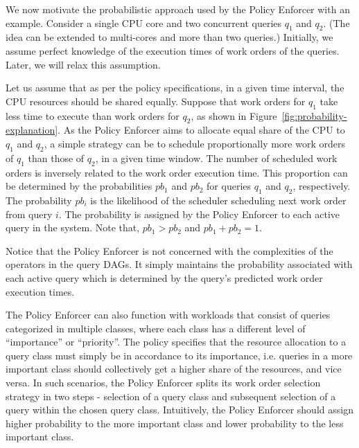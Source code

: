 We now motivate the probabilistic approach used by the Policy Enforcer with an example.
Consider a single CPU core and two concurrent queries $q_{1}$ and $q_{2}$. 
(The idea can be extended to multi-cores and more than two queries.)
Initially, we assume perfect knowledge of the execution times of work orders of the queries. 
Later, we will relax this assumption. 

Let us assume that as per the policy specifications, in a given time interval, the CPU resources should be shared equally. 
Suppose that work orders for $q_{1}$ take less time to execute than work orders for 
$q_{2}$, as shown in Figure~\ref{fig:probability-explanation}.
As the Policy Enforcer aims to allocate equal share of the CPU to $q_1$ and $q_2$, a simple strategy can be to schedule proportionally more work orders of $q_{1}$  than those of $q_{2}$, in a given time window. 
The number of scheduled work orders is inversely related to the work order execution 
time. 
This proportion can be determined by the probabilities $pb_{1}$ and $pb_{2}$ for queries $q_1$ and $q_2$, respectively.
The probability $pb_i$ is the likelihood of the scheduler scheduling next work order from query $i$. 
The probability is assigned by the Policy Enforcer to each active query in the system.
Note that, $pb_{1} > pb_{2}$ and $pb_{1} + pb_{2} = 1$.


Notice that the Policy Enforcer is not concerned with the complexities of the operators in the query DAGs. 
It simply maintains the probability associated with each active query which is determined by the query's predicted work order execution times.

The Policy Enforcer can also function with workloads that consist of queries categorized in multiple classes, where each class has a different level of ``importance'' or ``priority''. 
The policy specifies that the resource allocation to a query class must simply be in accordance to its importance, i.e. queries in a more important class should collectively get a higher share of the resources, and vice versa.
In such scenarios, the Policy Enforcer splits its work order selection strategy in two steps - selection of a query class and subsequent selection of a 
query within the chosen query class.
Intuitively, the Policy Enforcer should assign higher probability to the more 
important class and lower probability to the less important class.


